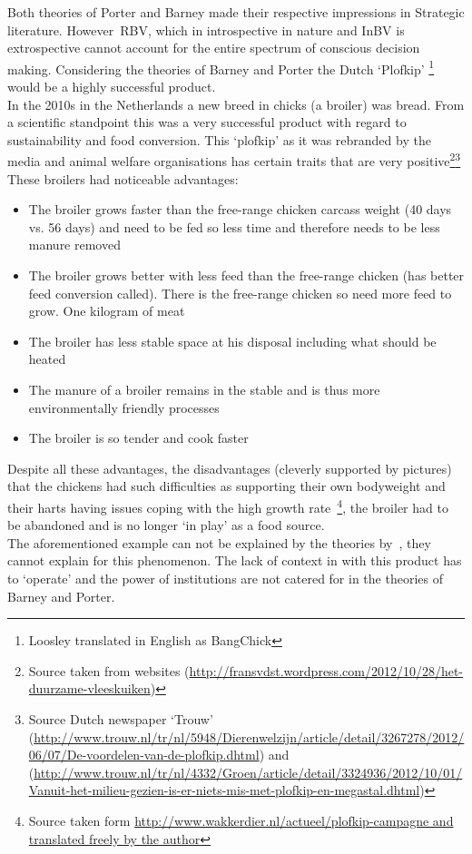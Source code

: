 



Both theories of Porter and Barney made their respective impressions in Strategic literature.  However~\gls{RBV}, which in introspective in nature and \gls{InBV} is extrospective cannot account for the entire spectrum of conscious decision making.
Considering the theories of Barney and Porter the Dutch `Plofkip' \footnote{Loosley translated in English as BangChick} would be a highly successful product.\\
In the 2010s in the Netherlands a new breed in chicks (a broiler) was bread. From a scientific standpoint this was a very successful product with regard to sustainability and food conversion. 
This `plofkip' as it was rebranded by the media and animal welfare organisations has certain traits that are very positive\footnote{Source taken from websites (\url{http://fransvdst.wordpress.com/2012/10/28/het-duurzame-vleeskuiken})}\footnote{Source Dutch newspaper `Trouw'
(\url{http://www.trouw.nl/tr/nl/5948/Dierenwelzijn/article/detail/3267278/2012/06/07/De-voordelen-van-de-plofkip.dhtml}) 
and (\url{http://www.trouw.nl/tr/nl/4332/Groen/article/detail/3324936/2012/10/01/Vanuit-het-milieu-gezien-is-er-niets-mis-met-plofkip-en-megastal.dhtml})}
These broilers had noticeable advantages:

\begin{itemize}
 \setlength{\itemsep}{0.75pt}
\item The broiler grows faster than the free-range chicken carcass weight (40 days vs. 56 days) and need to be fed so less time and therefore needs to be less manure removed
 \item    The broiler grows better with less feed than the free-range chicken (has better feed conversion called). There is the free-range chicken so need more feed to grow. One kilogram of meat
\item     The broiler has less stable space at his disposal including what should be heated
\item     The manure of a broiler remains in the stable and is thus more environmentally friendly processes
  \item   The broiler is so tender and cook faster
\end{itemize}
Despite all these advantages, the disadvantages (cleverly supported by pictures) that the chickens had such difficulties as supporting their own bodyweight and their harts having issues coping with the high growth rate~\footnote{Source taken form \url{http://www.wakkerdier.nl/actueel/plofkip-campagne and translated freely by the author}}, the broiler had to be abandoned and is no longer `in play' as a food source.\\
The aforementioned example can not be explained by the theories by~\cite{Porter:1980,Barney:1991}, they cannot explain for this phenomenon. 
The lack of context in with this product has to `operate'  and the power of institutions are not catered for in the theories of Barney and Porter.




